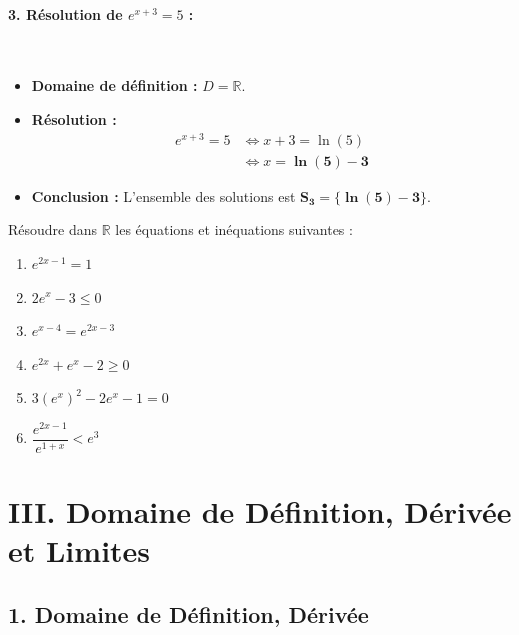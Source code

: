 \documentclass[12pt,a4paper]{article}
\begin{document}
\begin{tcolorbox}[colback=gray!5!white,colframe=myblue,title=\textbf{Correction détaillée}]
\vspace{0.4cm}

\paragraph{3. Résolution de $e^{x + 3} = 5$ :}\leavevmode\\[2mm]
\begin{itemize}
    \item \textbf{Domaine de définition :} $D = \mathbb{R}$.
    \item \textbf{Résolution :}
    \[
    \begin{aligned}
    e^{x + 3} = 5 &\iff x + 3 = \ln(5)\\[3mm]
                  &\iff x = \mathbf{\ln(5) - 3}
    \end{aligned}
    \]
    \item \textbf{Conclusion :} L'ensemble des solutions est $\mathbf{S_3 = \{\ln(5) - 3\}}$.
\end{itemize}

\end{tcolorbox}

\begin{tcolorbox}[colback=yellow!5!white,colframe=myred,title=\textbf{Devoir à la maison : Équations et inéquations exponentielles}]
Résoudre dans $\mathbb{R}$ les équations et inéquations suivantes :
\begin{enumerate}
    \item $e^{2x - 1} = 1$
    \item $2e^x - 3 \le 0$
    \item $e^{x - 4} = e^{2x - 3}$
    \item $e^{2x} + e^x - 2 \ge 0$
    \item $3(e^x)^2 - 2e^x - 1 = 0$
    \item $\dfrac{e^{2x - 1}}{e^{1 + x}} < e^3$
\end{enumerate}
\end{tcolorbox}

\section*{\color{myred}III. Domaine de Définition, Dérivée et Limites}


\subsection*{\color{myred}1. Domaine de Définition, Dérivée}
\end{document}
